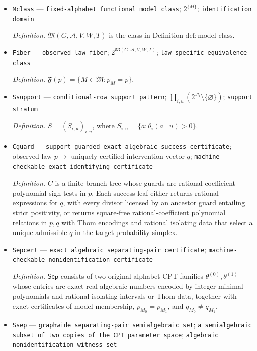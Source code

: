 \documentclass{article}
\begin{document}
\begin{itemize}
  \item \texttt{Mclass} --- \texttt{fixed-\allowbreak{}alphabet functional model class}; \(2^{\{M\}}\); \texttt{identification domain}
  \par\smallskip\noindent\emph{Definition.} \(\mathfrak M(G,\mathcal A,V,W,T)\) is the class in Definition \(\mathrm{def:model\text{-}class}\).
  \item \texttt{Fiber} --- \texttt{observed-\allowbreak{}law fiber}; \(2^{\mathfrak M(G,\mathcal A,V,W,T)}\); \texttt{law-\allowbreak{}specific equivalence class}
  \par\smallskip\noindent\emph{Definition.} \(\mathfrak F(p)=\{M\in\mathfrak M:p_M=p\}\).
  \item \texttt{Ssupport} --- \texttt{conditional-\allowbreak{}row support pattern}; \(\prod_{i,u}(2^{\mathcal A_i}\setminus\{\varnothing\})\); \texttt{support stratum}
  \par\smallskip\noindent\emph{Definition.} \(S=(S_{i,u})_{i,u}\), where \(S_{i,u}=\{a:\theta_i(a\mid u)>0\}\).
  \item \texttt{Cguard} --- \texttt{support-\allowbreak{}guarded exact algebraic success certificate}; observed law \(p\to\) uniquely certified intervention vector \(q\); \texttt{machine-\allowbreak{}checkable exact identifying certificate}
  \par\smallskip\noindent\emph{Definition.} \(C\) is a finite branch tree whose guards are rational-coefficient polynomial sign tests in \(p\). Each success leaf either returns rational expressions for \(q\), with every divisor licensed by an ancestor guard entailing strict positivity, or returns square-free rational-coefficient polynomial relations in \(p,q\) with Thom encodings and rational isolating data that select a unique admissible \(q\) in the target probability simplex.
  \item \texttt{Sepcert} --- \texttt{exact algebraic separating-\allowbreak{}pair certificate}; \texttt{machine-\allowbreak{}checkable nonidentification certificate}
  \par\smallskip\noindent\emph{Definition.} \(\mathsf{Sep}\) consists of two original-alphabet CPT families \(\theta^{(0)},\theta^{(1)}\) whose entries are exact real algebraic numbers encoded by integer minimal polynomials and rational isolating intervals or Thom data, together with exact certificates of model membership, \(p_{M_0}=p_{M_1}\), and \(q_{M_0}\ne q_{M_1}\).
  \item \texttt{Ssep} --- \texttt{graphwide separating-\allowbreak{}pair semialgebraic set}; \texttt{a semialgebraic subset of two copies of the CPT parameter space}; \texttt{algebraic nonidentification witness set}

\end{itemize}
\end{document}
